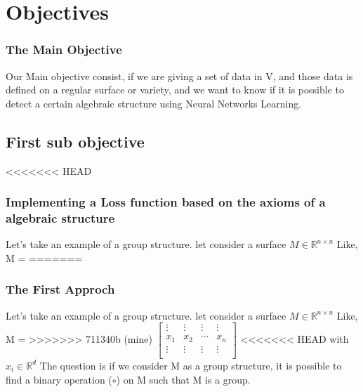 \documentclass{beamer}
\begin{document}
\section{Objectives}
\begin{frame}
    \frametitle{The Main Objective}
    Our Main objective consist,  if we are giving a set of data in V, and those data is defined on a regular surface or variety, and we want to know if it is possible to detect a certain algebraic structure using Neural Networks Learning.
\end{frame}
\subsection{First sub objective}
\begin{frame}
<<<<<<< HEAD
    \frametitle{Implementing a Loss function based on the axioms of a
    algebraic structure}
    Let's take an example of a group structure.
    let consider a surface $M \in \mathbb{R}^{n \times n}$
    Like,
    M =
=======
        \frametitle{The First Approch}
    Let's take an example of a group structure.
    let consider a surface $M \in \mathbb{R}^{n \times n}$
    Like, 
    M = 
>>>>>>> 711340b (mine)
    $\begin{bmatrix}
        \vdots & \vdots & \vdots &\vdots \\
        x_{1} & x_{2} & \cdots & x_{n} \\
        \vdots & \vdots & \vdots &\vdots \\
    \end{bmatrix}$
<<<<<<< HEAD
    with $ x_{i} \in \mathbb{R}^{d}$
    The question is if we consider M as a group structure, it is possible to find a binary operation ($\circ$) on M such that M is a group.
\end{frame}
\end{document}
